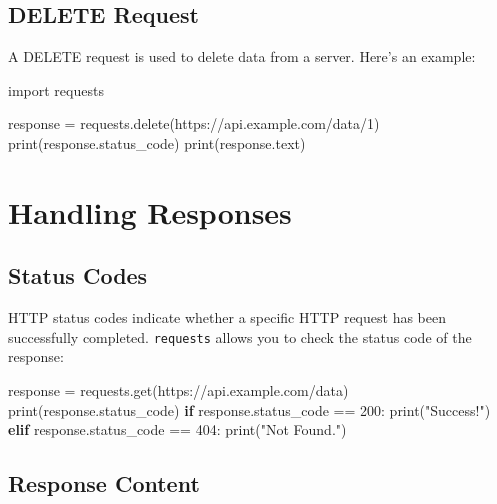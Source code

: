 \documentclass[
  letterpaper,
  DIV=11,
  numbers=noendperiod]{scrreprt}
\newenvironment{Shaded}{\begin{snugshade}}{\end{snugshade}}
\newcommand{\BuiltInTok}[1]{\textcolor[rgb]{0.00,0.23,0.31}{#1}}
\newcommand{\ControlFlowTok}[1]{\textcolor[rgb]{0.00,0.23,0.31}{\textbf{#1}}}
\newcommand{\DecValTok}[1]{\textcolor[rgb]{0.68,0.00,0.00}{#1}}
\newcommand{\ImportTok}[1]{\textcolor[rgb]{0.00,0.46,0.62}{#1}}
\newcommand{\NormalTok}[1]{\textcolor[rgb]{0.00,0.23,0.31}{#1}}
\newcommand{\OperatorTok}[1]{\textcolor[rgb]{0.37,0.37,0.37}{#1}}
\newcommand{\StringTok}[1]{\textcolor[rgb]{0.13,0.47,0.30}{#1}}
\begin{document}
\subsection{DELETE Request}\label{delete-request}

A DELETE request is used to delete data from a server. Here's an
example:

\begin{Shaded}
\begin{Highlighting}[]
\ImportTok{import}\NormalTok{ requests}

\NormalTok{response }\OperatorTok{=}\NormalTok{ requests.delete(}\StringTok{\textquotesingle{}https://api.example.com/data/1\textquotesingle{}}\NormalTok{)}
\BuiltInTok{print}\NormalTok{(response.status\_code)}
\BuiltInTok{print}\NormalTok{(response.text)}
\end{Highlighting}
\end{Shaded}

\section{Handling Responses}\label{handling-responses}

\subsection{Status Codes}\label{status-codes}

HTTP status codes indicate whether a specific HTTP request has been
successfully completed. \texttt{requests} allows you to check the status
code of the response:

\begin{Shaded}
\begin{Highlighting}[]
\NormalTok{response }\OperatorTok{=}\NormalTok{ requests.get(}\StringTok{\textquotesingle{}https://api.example.com/data\textquotesingle{}}\NormalTok{)}
\BuiltInTok{print}\NormalTok{(response.status\_code)}
\ControlFlowTok{if}\NormalTok{ response.status\_code }\OperatorTok{==} \DecValTok{200}\NormalTok{:}
    \BuiltInTok{print}\NormalTok{(}\StringTok{"Success!"}\NormalTok{)}
\ControlFlowTok{elif}\NormalTok{ response.status\_code }\OperatorTok{==} \DecValTok{404}\NormalTok{:}
    \BuiltInTok{print}\NormalTok{(}\StringTok{"Not Found."}\NormalTok{)}
\end{Highlighting}
\end{Shaded}

\subsection{Response Content}\label{response-content}
\end{document}
